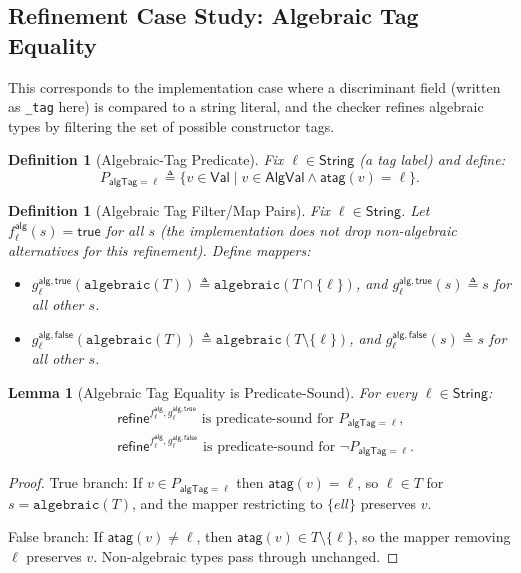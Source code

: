 \documentclass[11pt]{article}
\newtheorem{lemma}[theorem]{Lemma}
\newtheorem{definition}[theorem]{Definition}
\newcommand{\refineop}{\mathsf{refine}}
\newcommand{\String}{\mathsf{String}}
\newcommand{\AlgVal}{\mathsf{AlgVal}}
\newcommand{\Val}{\mathsf{Val}}
\begin{document}
\subsection{Refinement Case Study: Algebraic Tag Equality}

This corresponds to the implementation case where a discriminant field (written as \texttt{\_tag} here) is compared to a string literal,
and the checker refines algebraic types by filtering the set of possible constructor tags.

\begin{definition}[Algebraic-Tag Predicate]
\label{def:alg-tag-predicate}
Fix $\ell \in \String$ (a tag label) and define:
\[
P_{\mathsf{algTag}=\ell} \triangleq \{ v \in \Val \mid v \in \AlgVal \land \mathsf{atag}(v)=\ell \}.
\]
\end{definition}

\begin{definition}[Algebraic Tag Filter/Map Pairs]
\label{def:alg-tag-filter-map}
Fix $\ell \in \String$.
Let $f^{\mathsf{alg}}_\ell(s)=\mathsf{true}$ for all $s$ (the implementation does not drop non-algebraic alternatives for this refinement).
Define mappers:
\begin{itemize}
\item $g^{\mathsf{alg,true}}_\ell(\texttt{algebraic}(T)) \triangleq \texttt{algebraic}(T \cap \{\ell\})$, and $g^{\mathsf{alg,true}}_\ell(s)\triangleq s$ for all other $s$.
\item $g^{\mathsf{alg,false}}_\ell(\texttt{algebraic}(T)) \triangleq \texttt{algebraic}(T \setminus \{\ell\})$, and $g^{\mathsf{alg,false}}_\ell(s)\triangleq s$ for all other $s$.
\end{itemize}
\end{definition}

\begin{lemma}[Algebraic Tag Equality is Predicate-Sound]
\label{lem:alg-tag-predicate-sound}
For every $\ell \in \String$:
\begin{align*}
&\refineop^{f^{\mathsf{alg}}_\ell,g^{\mathsf{alg,true}}_\ell} \text{ is predicate-sound for } P_{\mathsf{algTag}=\ell}, \\
&\refineop^{f^{\mathsf{alg}}_\ell,g^{\mathsf{alg,false}}_\ell} \text{ is predicate-sound for } \neg P_{\mathsf{algTag}=\ell}.
\end{align*}
\end{lemma}

\begin{proof}
True branch: If $v \in P_{\mathsf{algTag}=\ell}$ then $\mathsf{atag}(v)=\ell$, so $\ell \in T$ for $s=\texttt{algebraic}(T)$, and the mapper restricting to $\{ell\}$ preserves $v$.

False branch: If $\mathsf{atag}(v) \neq \ell$, then $\mathsf{atag}(v) \in T \setminus \{\ell\}$, so the mapper removing $\ell$ preserves $v$. Non-algebraic types pass through unchanged.
\end{proof}
\end{document}
